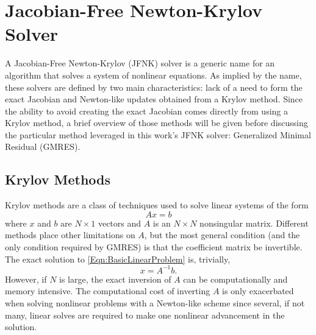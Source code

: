 \documentclass[Prelim,12pt]{WisconsinThesis}
\newcommand{\by}    {\!\times\!}
\begin{document}
\chapter[JFNK Solver]{Jacobian-Free Newton-Krylov Solver}

A Jacobian-Free Newton-Krylov (JFNK) solver is a generic name for an algorithm that solves a system of nonlinear equations.
As implied by the name, these solvers are defined by two main characteristics: lack of a need to form the exact Jacobian and Newton-like updates obtained from a Krylov method.
Since the ability to avoid creating the exact Jacobian comes directly from using a Krylov method, a brief overview of those methods will be given before discussing the particular method leveraged in this work's JFNK solver: Generalized Minimal Residual (GMRES).



\section{Krylov Methods}
Krylov methods are a class of techniques used to solve linear systems of the form
\begin{equation}
    A x = b
    \label{Eqn:BasicLinearProblem}
\end{equation}
where $x$ and $b$ are $N \by 1$ vectors and $A$ is an $N \by N$ nonsingular matrix.
Different methods place other limitations on $A$, but the most general condition (and the only condition required by GMRES) is that the coefficient matrix be invertible.
The exact solution to \cref{Eqn:BasicLinearProblem} is, trivially,
\begin{equation}
    x = A^{-1} b.
    \label{Eqn:BasicLinearSolution}
\end{equation}
However, if $N$ is large, the exact inversion of $A$ can be computationally and memory intensive.
The computational cost of inverting $A$ is only exacerbated when solving nonlinear problems with a Newton-like scheme since several, if not many, linear solves are required to make one nonlinear advancement in the solution.
\end{document}
